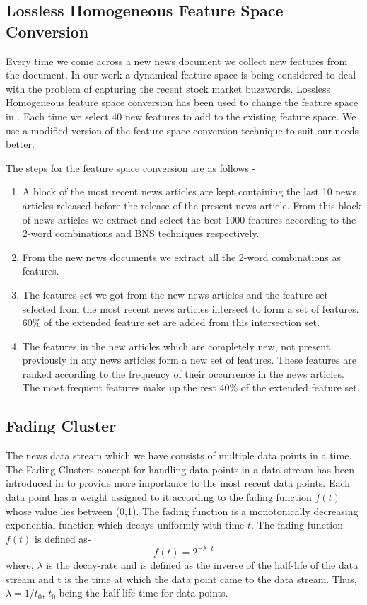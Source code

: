 \documentclass[review,twocolumn,5p]{elsarticle}
\begin{document}
\subsection{Lossless Homogeneous Feature Space Conversion}
\label{sec:lhfs}

Every time we come across a new news document we collect new features from the document. In our work a dynamical feature space is being considered to deal with the problem of capturing the recent stock market buzzwords. Lossless Homogeneous feature space conversion has been used to change the feature space in \cite{Masud:2010}. Each time we select 40 new features to add to the existing feature space. We use a modified version of the feature space conversion technique to suit our needs better. 

The steps for the feature space conversion are as follows - 
\begin{enumerate}
\item A block of the most recent news articles are kept containing the last 10 news articles released before the release of the present news article. From this block of news articles we extract and select the best 1000 features according to the 2-word combinations and BNS techniques respectively.

\item From the new news documents we extract all the 2-word combinations as features.

\item The features set we got from the new news articles and the feature set selected from the most recent news articles intersect to form a set of features. 60\% of the extended feature set are added from this intersection set. 

\item The features in the new articles which are completely new, not present previously in any news articles form a new set of features. These features are ranked according to the frequency of their occurrence in the news articles. The most frequent features make up the rest 40\% of the extended feature set. 
\end{enumerate}

\subsection{Fading Cluster}
\label{sec:fading}
The news data stream which we have consists of multiple data points in a time. The Fading Clusters concept for handling data points in a data stream has been introduced in \cite{Aggarwal:2005} to provide more importance to the most recent data points. Each data point has a weight assigned to it according to the fading function $f(t)$ whose value lies between (0,1). The fading function is a monotonically decreasing exponential function which decays uniformly with time $t$. The fading function $f(t)$ is defined as- 
\begin{equation}
f(t) = 2^{-\lambda \cdot t}
\end{equation}
where, $\lambda$ is the decay-rate and is defined as the inverse of the half-life of the data stream and t is the time at which the data point came to the data stream. Thus, $\lambda = 1/t_{0}$, $t_{0}$ being the half-life time for data points.
\end{document}
